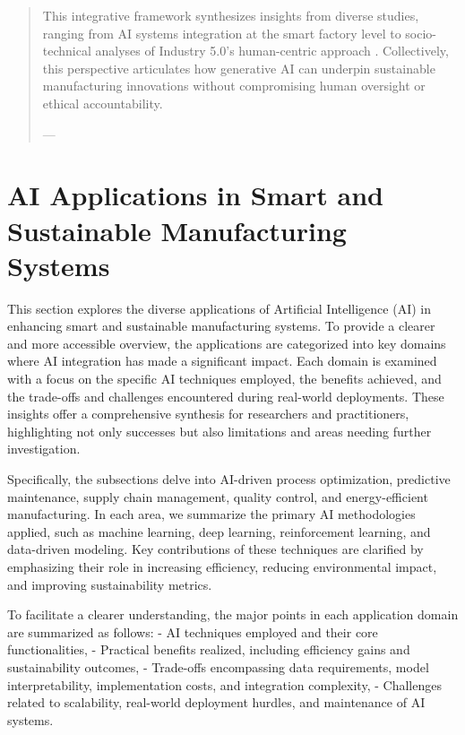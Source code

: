 \documentclass[sigconf]{acmart}
\begin{document}
\begin{abstract}
This integrative framework synthesizes insights from diverse studies, ranging from AI systems integration at the smart factory level \cite{ref11} to socio-technical analyses of Industry 5.0’s human-centric approach \cite{ref19}. Collectively, this perspective articulates how generative AI can underpin sustainable manufacturing innovations without compromising human oversight or ethical accountability.

---
\end{abstract}

\maketitle

\section{AI Applications in Smart and Sustainable Manufacturing Systems}

This section explores the diverse applications of Artificial Intelligence (AI) in enhancing smart and sustainable manufacturing systems. To provide a clearer and more accessible overview, the applications are categorized into key domains where AI integration has made a significant impact. Each domain is examined with a focus on the specific AI techniques employed, the benefits achieved, and the trade-offs and challenges encountered during real-world deployments. These insights offer a comprehensive synthesis for researchers and practitioners, highlighting not only successes but also limitations and areas needing further investigation.

Specifically, the subsections delve into AI-driven process optimization, predictive maintenance, supply chain management, quality control, and energy-efficient manufacturing. In each area, we summarize the primary AI methodologies applied, such as machine learning, deep learning, reinforcement learning, and data-driven modeling. Key contributions of these techniques are clarified by emphasizing their role in increasing efficiency, reducing environmental impact, and improving sustainability metrics.

To facilitate a clearer understanding, the major points in each application domain are summarized as follows:
- AI techniques employed and their core functionalities,
- Practical benefits realized, including efficiency gains and sustainability outcomes,
- Trade-offs encompassing data requirements, model interpretability, implementation costs, and integration complexity,
- Challenges related to scalability, real-world deployment hurdles, and maintenance of AI systems.
\end{document}
